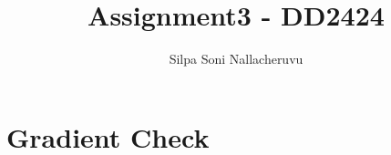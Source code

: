 \documentclass[11pt]{article}
\begin{document}
\title{Assignment3 - DD2424}
\author{Silpa Soni Nallacheruvu}
\date{}
\maketitle

\section*{Gradient Check}
\end{document}
